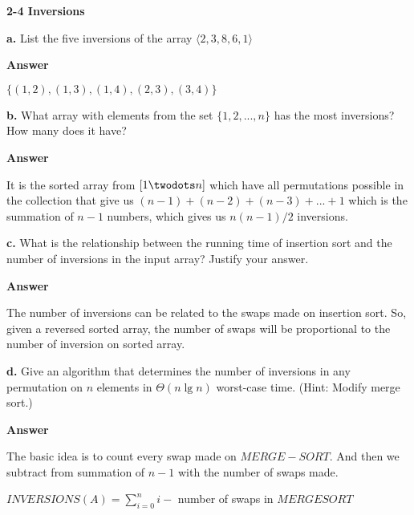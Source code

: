 \documentclass[11pt]{article}          %
\begin{document}

\textbf{2-4 Inversions}

\textbf{a.} List the five inversions of the array $\langle 2, 3, 8, 6, 1 \rangle$

\textbf{Answer}

$\{ (1,2), (1,3), (1,4), (2,3), (3,4) \}$

\textbf{b.} What array with elements from the set $\{ 1, 2, ..., n \}$ has the most inversions?
How many does it have?

\textbf{Answer}

It is the sorted array from $[1 \twodots n]$ which have all permutations possible in the collection
that give us $(n-1) + (n-2) + (n-3) + ... + 1$ which is the summation of $n-1$ numbers, which
gives us $n(n-1)/2$ inversions.

\textbf{c.} What is the relationship between the running time of insertion sort and the number of
inversions in the input array? Justify your answer.

\textbf{Answer}

The number of inversions can be related to the swaps made on insertion sort. So, given a reversed
sorted array, the number of swaps will be proportional to the number of inversion on sorted array.

\textbf{d.} Give an algorithm that determines the number of inversions in any permutation on $n$
elements in $\Theta (n \lg n)$ worst-case time. (Hint: Modify merge sort.)

\textbf{Answer}

The basic idea is to count every swap made on $MERGE-SORT$. And then we subtract from summation of
$n-1$ with the number of swaps made.

$INVERSIONS(A) = \sum_{i=0}^{n} i - $ number of swaps in $MERGESORT$
\end{document}
